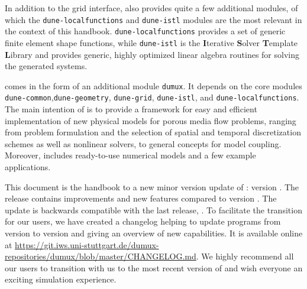 In addition to the grid interface, \Dune also provides quite a few
additional modules, of which the \texttt{dune-localfunctions} and
\texttt{dune-istl} modules are the most relevant in the context of
this handbook. \texttt{dune-localfunctions} provides a set of generic
finite element shape functions, while \texttt{dune-istl} is the
\textbf{I}terative \textbf{S}olver \textbf{T}emplate \textbf{L}ibrary
and provides generic, highly optimized linear algebra routines for
solving the generated systems.

\Dumux comes in the form of an additional module \texttt{dumux}.
It depends on the \Dune core modules
\texttt{dune-common},\texttt{dune-geometry}, \texttt{dune-grid}, \texttt{dune-istl}, and \texttt{dune-localfunctions}.
The main intention of \Dumux is to provide a framework for easy and efficient
implementation of new physical models for porous media flow problems,
ranging from problem formulation and the selection of
spatial and temporal discretization schemes as well as nonlinear solvers,
to general concepts for model coupling.
Moreover, \Dumux includes ready-to-use numerical models and a few example applications.

This document is the handbook to a new minor version update of \Dumux: version \DumuxVersion.
The release contains improvements and new features compared to version \DumuxOldVersion.
The update is backwards compatible with the last release, \DumuxOldVersion.
To facilitate the transition for our users, we have created a changelog
helping to update programs from version \DumuxOldVersion{} to version \DumuxVersion{} and giving an overview of new capabilities.
It is available online at
\url{https://git.iws.uni-stuttgart.de/dumux-repositories/dumux/blob/master/CHANGELOG.md}.
We highly recommend all our users to transition with us to the most recent version of \Dumux
and wish everyone an exciting simulation experience.
